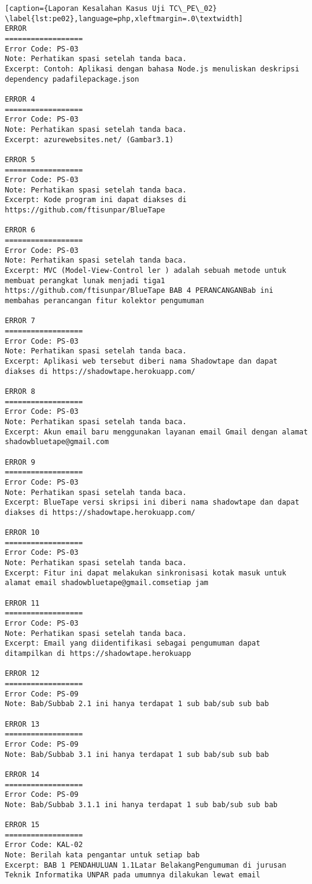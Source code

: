 \begin{enumerate}
\begin{lstlisting}[caption={Laporan Kesalahan Kasus Uji TC\_PE\_02}	\label{lst:pe02},language=php,xleftmargin=.0\textwidth]
ERROR 
==================
Error Code: PS-03
Note: Perhatikan spasi setelah tanda baca.
Excerpt: Contoh: Aplikasi dengan bahasa Node.js menuliskan deskripsi dependency padafilepackage.json 

ERROR 4
==================
Error Code: PS-03
Note: Perhatikan spasi setelah tanda baca.
Excerpt: azurewebsites.net/ (Gambar3.1)

ERROR 5
==================
Error Code: PS-03
Note: Perhatikan spasi setelah tanda baca.
Excerpt: Kode program ini dapat diakses di https://github.com/ftisunpar/BlueTape 

ERROR 6
==================
Error Code: PS-03
Note: Perhatikan spasi setelah tanda baca.
Excerpt: MVC (Model-View-Control ler ) adalah sebuah metode untuk membuat perangkat lunak menjadi tiga1 https://github.com/ftisunpar/BlueTape BAB 4 PERANCANGANBab ini membahas perancangan fitur kolektor pengumuman

ERROR 7
==================
Error Code: PS-03
Note: Perhatikan spasi setelah tanda baca.
Excerpt: Aplikasi web tersebut diberi nama Shadowtape dan dapat diakses di https://shadowtape.herokuapp.com/ 

ERROR 8
==================
Error Code: PS-03
Note: Perhatikan spasi setelah tanda baca.
Excerpt: Akun email baru menggunakan layanan email Gmail dengan alamat shadowbluetape@gmail.com

ERROR 9
==================
Error Code: PS-03
Note: Perhatikan spasi setelah tanda baca.
Excerpt: BlueTape versi skripsi ini diberi nama shadowtape dan dapat diakses di https://shadowtape.herokuapp.com/

ERROR 10
==================
Error Code: PS-03
Note: Perhatikan spasi setelah tanda baca.
Excerpt: Fitur ini dapat melakukan sinkronisasi kotak masuk untuk alamat email shadowbluetape@gmail.comsetiap jam

ERROR 11
==================
Error Code: PS-03
Note: Perhatikan spasi setelah tanda baca.
Excerpt: Email yang diidentifikasi sebagai pengumuman dapat ditampilkan di https://shadowtape.herokuapp

ERROR 12
==================
Error Code: PS-09
Note: Bab/Subbab 2.1 ini hanya terdapat 1 sub bab/sub sub bab

ERROR 13
==================
Error Code: PS-09
Note: Bab/Subbab 3.1 ini hanya terdapat 1 sub bab/sub sub bab

ERROR 14
==================
Error Code: PS-09
Note: Bab/Subbab 3.1.1 ini hanya terdapat 1 sub bab/sub sub bab

ERROR 15
==================
Error Code: KAL-02
Note: Berilah kata pengantar untuk setiap bab
Excerpt: BAB 1 PENDAHULUAN 1.1Latar BelakangPengumuman di jurusan Teknik Informatika UNPAR pada umumnya dilakukan lewat email 
\end{lstlisting}
	

\end{enumerate}
